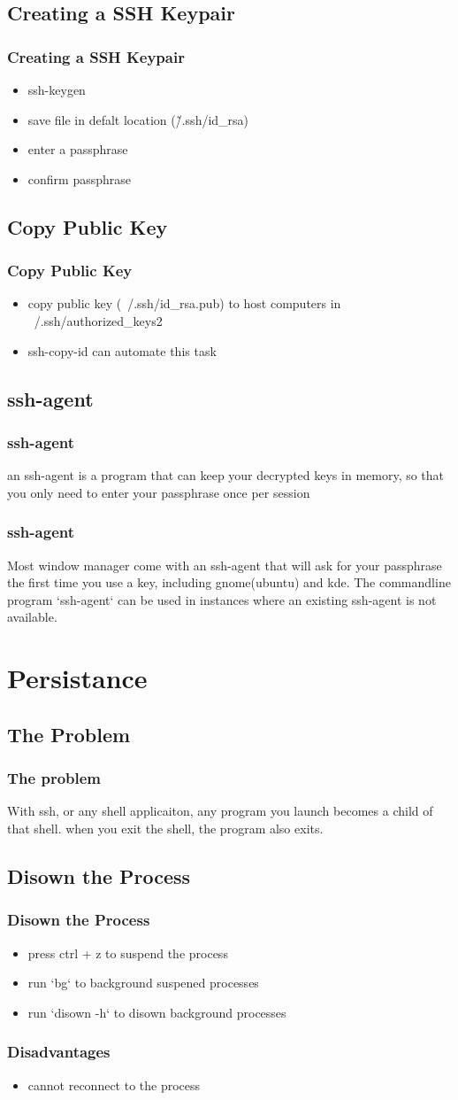 \documentclass[hyperref={pdfpagelabels=false}]{beamer}
\begin{document}
\subsection{Creating a SSH Keypair}
\frame
{
    \frametitle{Creating a SSH Keypair}
    \begin{itemize}
    \item{ssh-keygen}
    \item{save file in defalt location (\~/.ssh/id\_rsa)}
    \item{enter a passphrase}
    \item{confirm passphrase}
    \end{itemize}
}
\subsection{Copy Public Key}
\frame
{
    \frametitle{Copy Public Key}
    \begin{itemize}
    \item{copy public key (~/.ssh/id\_rsa.pub) to host computers in ~/.ssh/authorized\_keys2}
    \item{ssh-copy-id can automate this task}
    \end{itemize}
}
\subsection{ssh-agent}
\frame
{
    \frametitle{ssh-agent}
    an ssh-agent is a program that can keep your decrypted keys in memory, so that you only need to enter your passphrase once per session
}
\frame
{
    \frametitle{ssh-agent}
    Most window manager come with an ssh-agent that will ask for your passphrase the first time you use a key, including gnome(ubuntu) and kde.  The commandline program `ssh-agent` can be used in instances where an existing ssh-agent is not available.
}
\section{Persistance}
\subsection{The Problem}
\frame
{
    \frametitle{The problem}
    With ssh, or any shell applicaiton, any program you launch becomes a child of that shell.  when you exit the shell, the program also exits.

}
\subsection{Disown the Process}
\frame
{
  \frametitle{Disown the Process}
  \begin{itemize}
  \item{press ctrl + z to suspend the process}
  \item{run `bg` to background suspened processes}
  \item{run `disown -h` to disown background processes}
  \end{itemize}
}
\frame
{
    \frametitle{Disadvantages}
    \begin{itemize}
    \item{cannot reconnect to the process}
    \end{itemize}
}
\end{document}
